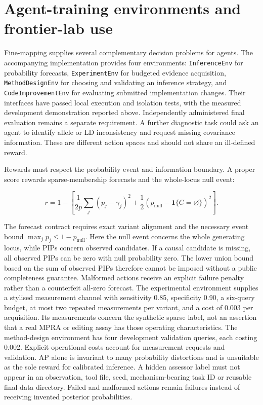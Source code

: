 \documentclass[
  british,
  10pt,
]{article}
\begin{document}
\section{Agent-training environments and frontier-lab
use}\label{agent-training-environments-and-frontier-lab-use}

Fine-mapping supplies several complementary decision problems for
agents. The accompanying implementation provides four environments:
\texttt{InferenceEnv} for probability forecasts, \texttt{ExperimentEnv}
for budgeted evidence acquisition, \texttt{MethodDesignEnv} for choosing
and validating an inference strategy, and \texttt{CodeImprovementEnv}
for evaluating submitted implementation changes. Their interfaces have
passed local execution and isolation tests, with the measured
development demonstration reported above. Independently administered
final evaluation remains a separate requirement. A further diagnostic
task could ask an agent to identify allele or LD inconsistency and
request missing covariance information. These are different action
spaces and should not share an ill-defined reward.

Rewards must respect the probability event and information boundary. A
proper score rewards sparse-membership forecasts and the whole-locus
null event:

\[r=1-\left[\frac{1}{2p}\sum_j(p_j-\gamma_j)^2+
\frac12(p_{\mathrm{null}}-\mathbf1\{C=\varnothing\})^2\right].\]

The forecast contract requires exact variant alignment and the necessary
event bound \(\max_jp_j\le1-p_{\mathrm{null}}\). Here the null event
concerns the whole generating locus, while PIPs concern observed
candidates. If a causal candidate is missing, all observed PIPs can be
zero with null probability zero. The lower union bound based on the sum
of observed PIPs therefore cannot be imposed without a public
completeness guarantee. Malformed actions receive an explicit failure
penalty rather than a counterfeit all-zero forecast. The experimental
environment supplies a stylised measurement channel with sensitivity
0.85, specificity 0.90, a six-query budget, at most two repeated
measurements per variant, and a cost of 0.003 per acquisition. Its
measurements concern the synthetic sparse label, not an assertion that a
real MPRA or editing assay has those operating characteristics. The
method-design environment has four development validation queries, each
costing 0.002. Explicit operational costs account for measurement
requests and validation. AP alone is invariant to many probability
distortions and is unsuitable as the sole reward for calibrated
inference. A hidden assessor label must not appear in an observation,
tool file, seed, mechanism-bearing task ID or reusable final-data
directory. Failed and malformed actions remain failures instead of
receiving invented posterior probabilities.
\end{document}
